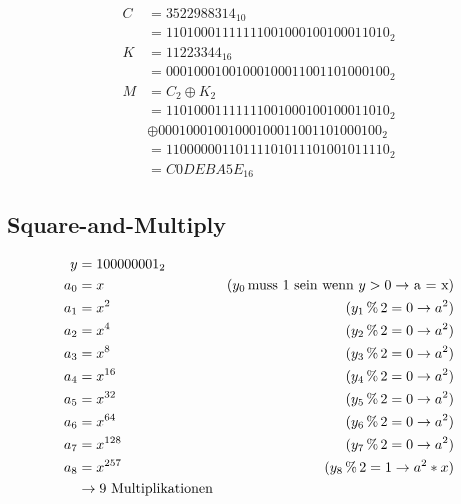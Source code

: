 \documentclass{article}
\begin{document}
\subsubsection{}

\begin{align*}
	C & = 3522988314_{10}\\
	  & = 1101 0001 1111 1100 1000 1001 0001 1010_2\\
	K & = 11223344_{16}\\
	  & = 0001 0001 0010 0010 0011 0011 0100 0100_2\\
	M & = C_2 \oplus K_2\\
	  & = 1101 0001 1111 1100 1000 1001 0001 1010_2\\
	  & \oplus 0001 0001 0010 0010 0011 0011 0100 0100_2\\
	  & = 1100 0000 1101 1110 1011 1010 0101 1110_2\\
	  & = C0DEBA5E_{16}
\end{align*}

\subsection{Square-and-Multiply}

\begin{align*}
	  y & = 1 0000 0001_2										\\
	a_0 & = x 				& (y_0\,\textnormal{muss 1 sein wenn $y > 0 \rightarrow$ a = x})\\
	a_1 & = x^2				& (y_1\,\%\,2 = 0 \rightarrow a^2)  \\
	a_2 & = x^4				& (y_2\,\%\,2 = 0 \rightarrow a^2)  \\
	a_3 & = x^8				& (y_3\,\%\,2 = 0 \rightarrow a^2) 	\\
	a_4 & = x^{16}			& (y_4\,\%\,2 = 0 \rightarrow a^2) 	\\
	a_5 & = x^{32}			& (y_5\,\%\,2 = 0 \rightarrow a^2) 	\\
	a_6 & = x^{64}			& (y_6\,\%\,2 = 0 \rightarrow a^2) 	\\
	a_7 & = x^{128}			& (y_7\,\%\,2 = 0 \rightarrow a^2) 	\\
	a_8 & = x^{257}			& (y_8\,\%\,2 = 1 \rightarrow a^2 * x)\\
		& \rightarrow \textnormal{9 Multiplikationen}
\end{align*}
\end{document}
